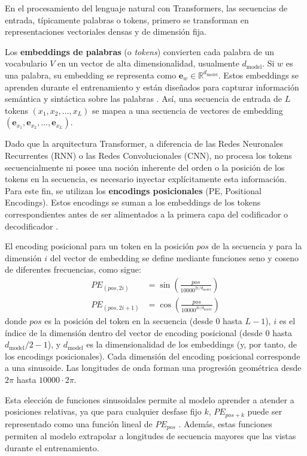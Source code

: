 En el procesamiento del lenguaje natural con Transformers, las secuencias de entrada, típicamente palabras o tokens, primero se transforman en representaciones vectoriales densas y de dimensión fija.

Los \textbf{embeddings de palabras} (o \textit{tokens}) convierten cada palabra de un vocabulario $V$ en un vector de alta dimensionalidad, usualmente $d_{\text{model}}$. Si $w$ es una palabra, su embedding se representa como $\mathbf{e}_w \in \mathbb{R}^{d_{\text{model}}}$. Estos embeddings se aprenden durante el entrenamiento y están diseñados para capturar información semántica y sintáctica sobre las palabras \citep{Mikolov2013word2vec, Pennington2014glove}. Así, una secuencia de entrada de $L$ tokens $(x_1, x_2, \ldots, x_L)$ se mapea a una secuencia de vectores de embedding $(\mathbf{e}_{x_1}, \mathbf{e}_{x_2}, \ldots, \mathbf{e}_{x_L})$.

Dado que la arquitectura Transformer, a diferencia de las Redes Neuronales Recurrentes (RNN) o las Redes Convolucionales (CNN), no procesa los tokens secuencialmente ni posee una noción inherente del orden o la posición de los tokens en la secuencia, es necesario inyectar explícitamente esta información. Para este fin, se utilizan los \textbf{encodings posicionales} (PE, Positional Encodings). Estos encodings se suman a los embeddings de los tokens correspondientes antes de ser alimentados a la primera capa del codificador o decodificador \citep{Vaswani2017}.

El encoding posicional para un token en la posición $pos$ de la secuencia y para la dimensión $i$ del vector de embedding se define mediante funciones seno y coseno de diferentes frecuencias, como sigue:
\begin{align}
PE_{(pos, 2i)} &= \sin\left(\frac{pos}{10000^{2i/d_{\text{model}}}}\right) \label{eq:pe_sin} \\
PE_{(pos, 2i+1)} &= \cos\left(\frac{pos}{10000^{2i/d_{\text{model}}}}\right) \label{eq:pe_cos}
\end{align}
donde $pos$ es la posición del token en la secuencia (desde $0$ hasta $L-1$), $i$ es el índice de la dimensión dentro del vector de encoding posicional (desde $0$ hasta $d_{\text{model}}/2 - 1$), y $d_{\text{model}}$ es la dimensionalidad de los embeddings (y, por tanto, de los encodings posicionales). Cada dimensión del encoding posicional corresponde a una sinusoide. Las longitudes de onda forman una progresión geométrica desde $2\pi$ hasta $10000 \cdot 2\pi$.

Esta elección de funciones sinusoidales permite al modelo aprender a atender a posiciones relativas, ya que para cualquier desfase fijo $k$, $PE_{pos+k}$ puede ser representado como una función lineal de $PE_{pos}$ \citep{Vaswani2017}. Además, estas funciones permiten al modelo extrapolar a longitudes de secuencia mayores que las vistas durante el entrenamiento.

